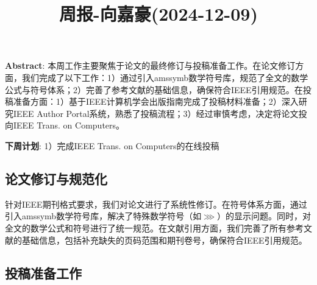 \documentclass[11pt,a4paper]{article}
\title{周报-向嘉豪(2024-12-09)}
\renewcommand{\maketitle}{
  \begin{center}
    \LARGE\bfseries\thetitle
  \end{center}
}
\begin{document}
\maketitle


\noindent \textbf{Abstract}: 本周工作主要聚焦于论文的最终修订与投稿准备工作。在论文修订方面，我们完成了以下工作：1）通过引入amssymb数学符号库，规范了全文的数学公式与符号体系；2）完善了参考文献的基础信息，确保符合IEEE引用规范。在投稿准备方面：1）基于IEEE计算机学会出版指南完成了投稿材料准备；2）深入研究IEEE Author Portal系统，熟悉了投稿流程；3）经过审慎考虑，决定将论文投向IEEE Trans. on Computers。

\noindent \textbf{下周计划}: 1）完成IEEE Trans. on Computers的在线投稿


\subsection{论文修订与规范化}

针对IEEE期刊格式要求，我们对论文进行了系统性修订。在符号体系方面，通过引入amssymb数学符号库，解决了特殊数学符号（如$\ggg$）的显示问题。同时，对全文的数学公式和符号进行了统一规范。在文献引用方面，我们完善了所有参考文献的基础信息，包括补充缺失的页码范围和期刊卷号，确保符合IEEE引用规范。

\subsection{投稿准备工作}
\end{document}

